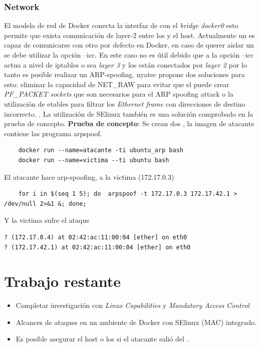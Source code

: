 \documentclass[letter,10pt]{article}
\begin{document}
\subsubsection{Network}

El modelo de red de Docker conecta la interfaz de \container con el 
\emph{bridge docker0} esto permite que exista comunicación de layer-2 entre 
los \containers y el host. Actualmente un \container es capaz de comunicarse
con otro \container por defecto en Docker, en caso de querer aislar un 
\container se debe utilizar la opción --icc. En este caso no es útil debido que 
a la opción --icc actua a nivel de iptables o sea \emph{layer 3} y los 
\containers están conectados por \emph{layer 2} por lo tanto es posible realizar 
un ARP-spoofing. nyatec propone dos soluciones para esto: eliminar la capacidad 
de NET\_RAW para evitar que el \container puede crear \emph{PF\_PACKET sockets} 
que son necesarios para el ARP spoofing attack o la utilización de etables para 
filtrar los \emph{Ethernet frame} con direcciones de destino incorrecto. \cite{nyantec:2015:Online}.
La utilización de SElinux también es una solución comprobado en la prueba de concepto. 
\textbf{Prueba de concepto}:  Se crean dos \containers, la imagen de atacante contiene las programa arpspoof. 
\begin{verbatim}
	docker run --name=atacante -ti ubuntu_arp bash
	docker run --name=victima --ti ubuntu bash
\end{verbatim}

El atacante hace arp-spoofing, a la victima (172.17.0.3)
\begin{verbatim}
	for i in $(seq 1 5); do  arpspoof -t 172.17.0.3 172.17.42.1 > /dev/null 2>&1 &; done;
\end{verbatim}
Y la victima sufre el ataque
\begin{verbatim}
? (172.17.0.4) at 02:42:ac:11:00:04 [ether] on eth0
? (172.17.42.1) at 02:42:ac:11:00:04 [ether] on eth0
\end{verbatim}



\section{Trabajo restante}

\begin{itemize}
	\item Completar investigación con \emph{Linux Capabilities} y \emph{Mandatory Access Control}
	\item Alcances de ataques en un ambiente de Docker con SElinux (MAC) integrado.
	\item Es posible asegurar el host o los \containers   si el atacante salió del \container.
\end{itemize}
\end{document}
